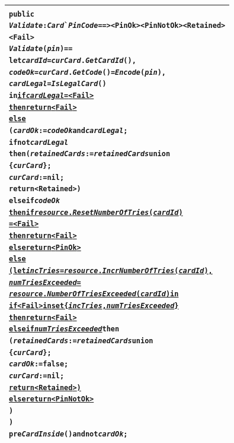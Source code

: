 \documentclass[\pformat,12pt,twoside]{article}
\newenvironment{VDMgray}%
{\begin{tabular}{|G|}\hline\small\begin{alltt}}%
{\end{alltt}\normalsize\\
 \hline\end{tabular}}
\begin{document}
\begin{VDMgray}
 \textbf{public}
 \textit{Validate} : \textit{Card}\`{}\textit{PinCode} ==\texttt{>} \texttt{<}PinOk\texttt{>} {\textbar} \texttt{<}PinNotOk\texttt{>} {\textbar} \texttt{<}Retained\texttt{>} {\textbar}
                             \texttt{<}Fail\texttt{>}
 \textit{Validate}(\textit{pin}) ==
   \textbf{let} \textit{cardId} = \textit{curCard}.\textit{GetCardId}(),
       \textit{codeOk} = \textit{curCard}.\textit{GetCode}() = \textit{Encode}(\textit{pin}),
       \textit{cardLegal} = \textit{IsLegalCard}()
   \textbf{in} \textbf{{\underline{if}}} \textit{{\underline{cardLegal}}} {\underline{= \texttt{<}Fail\texttt{>}}}
      \textbf{{\underline{then}}} \textbf{{\underline{return}}} {\underline{\texttt{<}Fail\texttt{>}}}
      \textbf{{\underline{else}}}
         (\textit{cardOk} := \textit{codeOk} \textbf{and} \textit{cardLegal};
          \textbf{if} \textbf{not} \textit{cardLegal}
          \textbf{then} (\textit{retainedCards} := \textit{retainedCards} \textbf{union}
	                             \{\textit{curCard}\};
          \textit{curCard} := \textbf{nil};
          \textbf{return} \texttt{<}Retained\texttt{>})
      \textbf{elseif} \textit{codeOk}
      \textbf{{\underline{then}}} \textbf{{\underline{if}}} \textit{{\underline{resource}}}{\underline{.}}\textit{{\underline{ResetNumberOfTries}}}{\underline{(}}\textit{{\underline{cardId}}}{\underline{) 
= \texttt{<}Fail\texttt{>}}}
              \textbf{{\underline{then}}} \textbf{{\underline{return}}} {\underline{\texttt{<}Fail\texttt{>}}}
              \textbf{{\underline{else}}} \textbf{{\underline{return}}} {\underline{\texttt{<}PinOk\texttt{>}}}
      \textbf{{\underline{else}}}
         {\underline{(}}\textbf{{\underline{let}}} \textit{{\underline{incTries}}} {\underline{=}} \textit{{\underline{resource}}}{\underline{.}}\textit{{\underline{IncrNumberOfTries}}}{\underline{(}}\textit{{\underline{cardId}}}{\underline{),}}
             \textit{{\underline{numTriesExceeded}}} {\underline{=}}
                    \textit{{\underline{resource}}}{\underline{.}}\textit{{\underline{NumberOfTriesExceeded}}}{\underline{(}}\textit{{\underline{cardId}}}{\underline{)}} \textbf{{\underline{in}}}
            \textbf{{\underline{if}}} {\underline{\texttt{<}Fail\texttt{>}}} \textbf{{\underline{in set}}} {\underline{\{}}\textit{{\underline{incTries}}}{\underline{,}} \textit{{\underline{numTriesExceeded}}}{\underline{\}}}
            \textbf{{\underline{then}}} \textbf{{\underline{return}}} {\underline{\texttt{<}Fail\texttt{>}}}
            \textbf{{\underline{elseif}}} \textit{{\underline{numTriesExceeded}}} \textbf{then}
              (\textit{retainedCards} := \textit{retainedCards} \textbf{union}
                                \{\textit{curCard}\};
               \textit{cardOk} := \textbf{false};
               \textit{curCard} := \textbf{nil};
               \textbf{{\underline{return}}} {\underline{\texttt{<}Retained\texttt{>})}}
            \textbf{{\underline{else}}} \textbf{{\underline{return}}} {\underline{\texttt{<}PinNotOk\texttt{>}}}
            )
       )
 \textbf{pre} \textit{CardInside}() \textbf{and} \textbf{not} \textit{cardOk};
\end{VDMgray}
\end{document}
